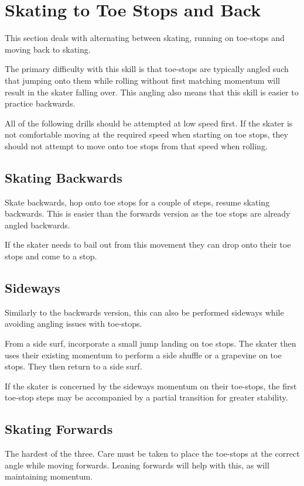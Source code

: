 \section{Skating to Toe Stops and Back}
\label{sec:toe_stop/skating_to_toe}

This section deals with alternating between skating, running on toe-stops and moving back to skating.

The primary difficulty with this skill is that toe-stops are typically angled such that jumping onto them while rolling without first matching momentum will result in the skater falling over.    
This angling also means that this skill is easier to practice backwards.


All of the following drills should be attempted at low speed first. 
If the skater is not comfortable moving at the required speed when starting on toe stops, they should not attempt to move onto toe stops from that speed when rolling.  

\subsection{Skating Backwards}
Skate backwards, hop onto toe stops for a couple of steps, resume skating backwards.
This is easier than the forwards version as the toe stops are already angled backwards. 

If the skater needs to bail out from this movement they can drop onto their toe stops and come to a stop. 


\subsection{Sideways}
Similarly to the backwards version, this can also be performed sideways while avoiding angling issues with toe-stops.  

From a side surf, incorporate a small jump landing on toe stops.
The skater then uses their existing momentum to perform a side shuffle or a grapevine on toe stops.   
They then return to a side surf.

If the skater is concerned by the sideways momentum on their toe-stops, the first toe-stop steps may be accompanied by a partial transition for greater stability.  


\subsection{Skating Forwards}
The hardest of the three. 
Care must be taken to place the toe-stops at the correct angle while moving forwards. 
Leaning forwards will help with this, as will maintaining momentum. 


